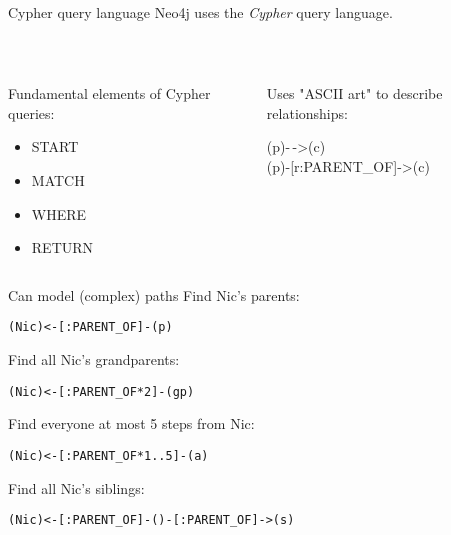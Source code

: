 \documentclass{beamer}
\newcommand{\linespace}{\vskip 0.25cm}
\begin{document}
\begin{frame}{Cypher query language}
			Neo4j uses the \emph{Cypher} query language.
			
			\linespace
			
			~\\
			
			\linespace

	\begin{columns}
		\begin{column}[T]{0.5\textwidth}
			
			Fundamental elements of Cypher queries:
		\begin{itemize}
			\item START
			\item MATCH
			\item WHERE
			\item RETURN
		\end{itemize}
		
	\end{column}
	\begin{column}[T]{0.5\textwidth}
		Uses "ASCII art" to describe relationships:
	
	\linespace
\begin{center}
	(p)-$\,$->(c) \\
	\linespace
	(p)-[r:PARENT\_OF]->(c)
\end{center}

	\end{column}	
	\end{columns}
\end{frame}

\begin{frame}{Can model (complex) paths}
	Find Nic's parents:
	
	\begin{center}
		\texttt{(Nic)<-[:PARENT\_OF]-(p)}
	\end{center}

	Find all Nic's grandparents:
	
	\begin{center}
		\texttt{(Nic)<-[:PARENT\_OF*2]-(gp)}
	\end{center}
	
		Find everyone at most 5 steps from Nic:
		
		\begin{center}
			\texttt{(Nic)<-[:PARENT\_OF*1..5]-(a)}
		\end{center}
		
	Find all Nic's siblings:
	
	\begin{center}
		\texttt{(Nic)<-[:PARENT\_OF]-()-[:PARENT\_OF]->(s)}
	\end{center}
	
\end{frame}
\end{document}
